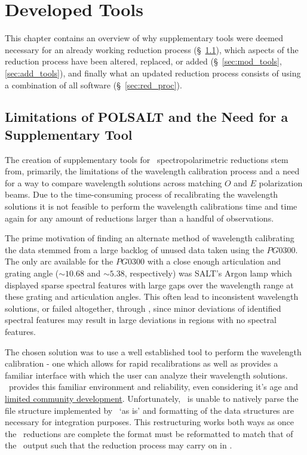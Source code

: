 \chapter{Developed Tools}

This chapter contains an overview of why supplementary tools were deemed necessary for an already working reduction process (\S~\ref{sec:polsalt_limits}), which aspects of the reduction process have been altered, replaced, or added (\S~\ref{sec:mod_tools}, \ref{sec:add_tools}), and finally what an updated reduction process consists of using a combination of all software (\S~\ref{sec:red_proc}).


\section{Limitations of POLSALT and the Need for a Supplementary Tool} \label{sec:polsalt_limits} %

The creation of supplementary tools for \polsalt\ spectropolarimetric reductions stem from, primarily, the limitations of the wavelength calibration process and a need for a way to compare wavelength solutions across matching $O$ and $E$ polarization beams. Due to the time-consuming process of recalibrating the wavelength solutions it is not feasible to perform the wavelength calibrations time and time again for any amount of reductions larger than a handful of observations.
\prgph

The prime motivation of finding an alternate method of wavelength calibrating the data stemmed from a large backlog of unused data taken using the $PG0300$. The only arc available for the $PG0300$ with a close enough articulation and grating angle ($\sim 10.68$ and $\sim 5.38$, respectively) was \gls{SALT}'s Argon lamp which displayed sparse spectral features with large gaps over the wavelength range at these grating and articulation angles. This often lead to inconsistent wavelength solutions, or failed altogether, through \polsalt, since minor deviations of identified spectral features may result in large deviations in regions with no spectral features.
\prgph

The chosen solution was to use a well established tool to perform the wavelength calibration - one which allows for rapid recalibrations as well as provides a familiar interface with which the user can analyze their wavelength solutions. \iraf\ provides this familiar environment and reliability, even considering it's age and \hyperlink{https://github.com/iraf-community/iraf}{limited community development}. Unfortunately, \iraf\ is unable to natively parse the file structure implemented by \polsalt\ `as is' and formatting of the data structures are necessary for integration purposes. This restructuring works both ways as once the \iraf\ reductions are complete the format must be reformatted to match that of the \polsalt\ output such that the reduction process may carry on in \polsalt.
\prgph

